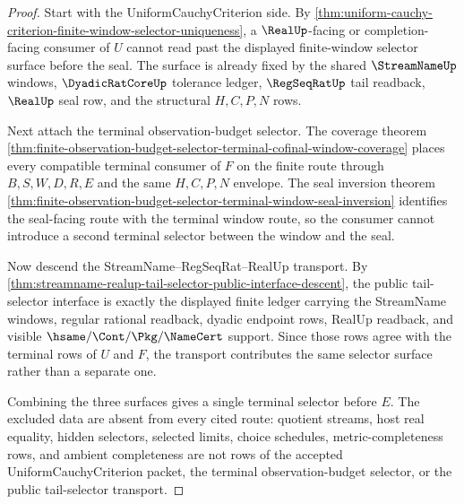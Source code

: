 \begin{proof}
Start with the UniformCauchyCriterion side. By \autoref{thm:uniform-cauchy-criterion-finite-window-selector-uniqueness}, a $\RealUp$-facing or completion-facing consumer of $U$ cannot read past the displayed finite-window selector surface before the seal. The surface is already fixed by the shared $\StreamNameUp$ windows, $\DyadicRatCoreUp$ tolerance ledger, $\RegSeqRatUp$ tail readback, $\RealUp$ seal row, and the structural $H,C,P,N$ rows.

Next attach the terminal observation-budget selector. The coverage theorem \autoref{thm:finite-observation-budget-selector-terminal-cofinal-window-coverage} places every compatible terminal consumer of $F$ on the finite route through $B,S,W,D,R,E$ and the same $H,C,P,N$ envelope. The seal inversion theorem \autoref{thm:finite-observation-budget-selector-terminal-window-seal-inversion} identifies the seal-facing route with the terminal window route, so the consumer cannot introduce a second terminal selector between the window and the seal.

Now descend the StreamName--RegSeqRat--RealUp transport. By \autoref{thm:streamname-realup-tail-selector-public-interface-descent}, the public tail-selector interface is exactly the displayed finite ledger carrying the StreamName windows, regular rational readback, dyadic endpoint rows, RealUp readback, and visible $\hsame/\Cont/\Pkg/\NameCert$ support. Since those rows agree with the terminal rows of $U$ and $F$, the transport contributes the same selector surface rather than a separate one.

Combining the three surfaces gives a single terminal selector before $E$. The excluded data are absent from every cited route: quotient streams, host real equality, hidden selectors, selected limits, choice schedules, metric-completeness rows, and ambient completeness are not rows of the accepted UniformCauchyCriterion packet, the terminal observation-budget selector, or the public tail-selector transport.
\end{proof}
